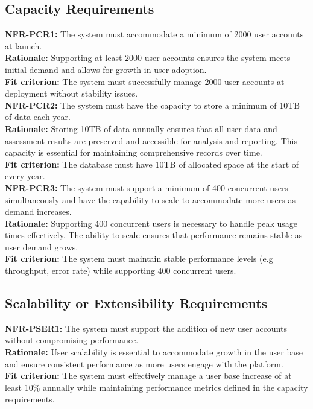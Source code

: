 \documentclass[12pt]{article}
\begin{document}
\subsection{Capacity Requirements}

\noindent\textbf{NFR-PCR1: }The system must accommodate a minimum of 2000 user accounts at launch.\\
\textbf{Rationale: }Supporting at least 2000 user accounts ensures the system meets initial demand and allows for growth in user adoption.\\
\textbf{Fit criterion: }The system must successfully manage 2000 user accounts at deployment without stability issues.\\

\noindent\textbf{NFR-PCR2: }The system must have the capacity to store a minimum of 10TB of data each year.\\
\textbf{Rationale: }Storing 10TB of data annually ensures that all user data and assessment results are preserved and accessible for analysis and reporting. This capacity is essential for maintaining comprehensive records over time.\\
\textbf{Fit criterion: }The database must have 10TB of allocated space at the start of every year.\\

\noindent\textbf{NFR-PCR3: }The system must support a minimum of 400 concurrent users simultaneously and have the capability to scale to accommodate more users as demand increases.\\
\textbf{Rationale: }Supporting 400 concurrent users is necessary to handle peak usage times effectively. The ability to scale ensures that performance remains stable as user demand grows.\\
\textbf{Fit criterion: }The system must maintain stable performance levels (e.g throughput, error rate) while supporting 400 concurrent users.\\


\subsection{Scalability or Extensibility Requirements}

\noindent\textbf{NFR-PSER1: }The system must support the addition of new user accounts without compromising performance.\\
\textbf{Rationale: }User scalability is essential to accommodate growth in the user base and ensure consistent performance as more users engage with the platform.\\
\textbf{Fit criterion: }The system must effectively manage a user base increase of at least 10\% annually while maintaining performance metrics defined in the capacity requirements.\\
\end{document}
